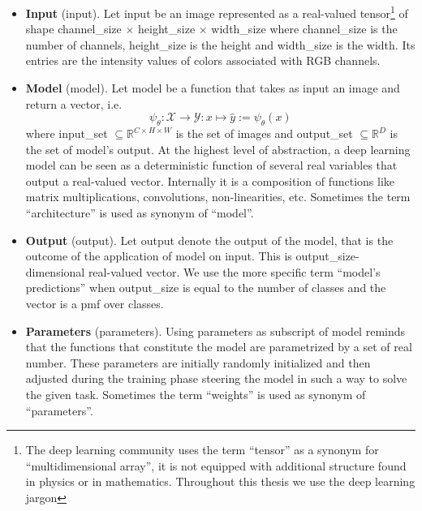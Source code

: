 \begin{itemize}
\item \textbf{Input} (\gls{input}). Let \gls{input} be an image represented as a real-valued tensor\footnote{The deep learning community uses the term ``tensor'' as a synonym for ``multidimensional array'', it is not equipped with additional structure found in physics or in mathematics. Throughout this thesis we use the deep learning jargon} of shape \gls{channel_size} $\times$ \gls{height_size} $\times$ \gls{width_size} where \gls{channel_size} is the number of channels, \gls{height_size} is the height and \gls{width_size} is the width. Its entries are the intensity values of colors associated with RGB channels.

\item \textbf{Model} (\gls{model}). Let \gls{model} be a function that takes as input an image and return a vector, i.e.\
\begin{equation}
  \psi_\theta: \mathcal{X} \to \mathcal{Y}
     : x \mapsto \hat{y} := \psi_\theta \left(x\right)
  \label{eq:model}
\end{equation}
where \gls{input_set} $\subseteq \mathbb{R}^{C \times H \times W}$ is the set of images and \gls{output_set} $\subseteq \mathbb{R}^{D}$ is the set of model's output. At the highest level of abstraction, a deep learning model can be seen as a deterministic function of several real variables that output a real-valued vector. Internally it is a composition of functions like matrix multiplications, convolutions, non-linearities, etc. Sometimes the term ``architecture'' is used as synonym of ``model''.

\item \textbf{Output} (\gls{output}). Let \gls{output} denote the output of the model, that is the outcome of the application of \gls{model} on \gls{input}. This is \gls{output_size}-dimensional real-valued vector. We use the more specific term ``model's predictions'' when \gls{output_size} is equal to the number of classes and the vector is a \acrfull{pmf} over classes.

\item \textbf{Parameters} (\gls{parameters}). Using \gls{parameters} as subscript of \gls{model}
reminds that the functions that constitute the model are parametrized by a set of real number. These parameters are initially randomly initialized and then adjusted during the training phase steering the model in such a way to solve the given task. Sometimes the term ``weights'' is used as synonym of ``parameters''.


\end{itemize}
